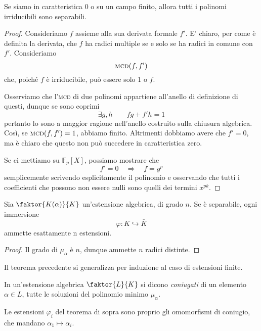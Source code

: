 \begin{multicols}{2}
\begin{theorem}
	Se siamo in caratteristica $ 0 $ o su un campo finito, allora tutti i polinomi irriducibili sono separabili.
\end{theorem}
\begin{proof}
	Consideriamo $ f $ assieme alla sua derivata formale $ f' $. E' chiaro, per come è definita la derivata, che $ f $ ha radici multiple se e solo se ha radici in comune con $ f' $. Consideriamo
	$$  \textsc{mcd}(f, f')  $$
	che, poiché $ f $ è irriducibile, può essere solo $ 1 $ o $ f $.
	
	Osserviamo che l'\textsc{mcd} di due polinomi appartiene all'anello di definizione di questi, dunque se sono coprimi
	\[ \exists g, h  \qquad fg +f'h = 1 \]
	pertanto lo sono a maggior ragione nell'anello costruito sulla chiusura algebrica. Così, se $  \textsc{mcd}(f, f') = 1  $, abbiamo finito. Altrimenti dobbiamo avere che $ f'=0 $, ma è chiaro che questo non può succedere in caratteristica zero.
	
	Se ci mettiamo su $ \mathbb{F}_p[X] $, possiamo mostrare che
	\[ f' = 0 \quad\Rightarrow\quad f = g^p \]
	semplicemente scrivendo esplicitamente il polinomio e osservando che tutti i coefficienti che possono non essere nulli sono quelli dei termini $ x^{pk} $.
\end{proof}

\begin{theorem}
	Sia $ \faktor{K(\alpha)}{K} $ un'estensione algebrica, di grado $ n $. Se è separabile, ogni immersione
	\[ \varphi: K \hookrightarrow \bar{K} \]
	ammette esattamente n estensioni.
\end{theorem}
\begin{proof}
	Il grado di $ \mu_\alpha $ è $ n $, dunque ammette $ n $ radici distinte.
\end{proof}
\begin{remark}
	Il teorema precedente si generalizza per induzione al caso di estensioni finite.
\end{remark}

\begin{definition}
	In un'estensione algebrica $ \faktor{L}{K} $ si dicono \emph{coniugati} di un elemento $ \alpha \in L $, tutte le soluzioni del polinomio minimo $ \mu_\alpha $.
\end{definition}

\begin{remark}
	Le estensioni $ \varphi_i $ del teorema di sopra sono proprio gli omomorfismi di coniugio, che mandano $ \alpha_1 \mapsto \alpha_i $.
\end{remark}


\end{multicols}
